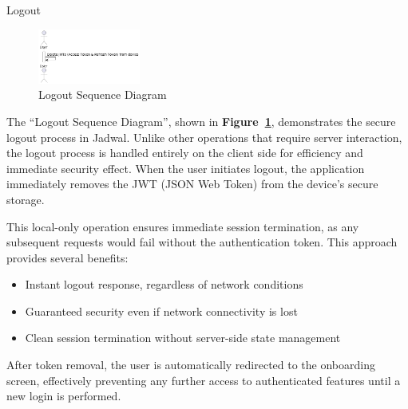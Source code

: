 \begin{usecase}{Logout}
\end{usecase}

\begin{figure}[!h]
  \centering
  \includegraphics[width=0.3\textwidth]{images/docs/diagrams/sequence-diagrams/all-sequence-diagrams/Logout.png}
  \caption{Logout Sequence Diagram}
  \label{fig:seq/logout}
\end{figure}

The ``Logout Sequence Diagram'', shown in \textbf{Figure~\ref{fig:seq/logout}}, demonstrates the secure logout process in Jadwal. Unlike other operations that require server interaction, the logout process is handled entirely on the client side for efficiency and immediate security effect. When the user initiates logout, the application immediately removes the JWT (JSON Web Token) from the device's secure storage.

This local-only operation ensures immediate session termination, as any subsequent requests would fail without the authentication token. This approach provides several benefits:
\begin{itemize}
  \item Instant logout response, regardless of network conditions
  \item Guaranteed security even if network connectivity is lost
  \item Clean session termination without server-side state management
\end{itemize}

After token removal, the user is automatically redirected to the onboarding screen, effectively preventing any further access to authenticated features until a new login is performed.